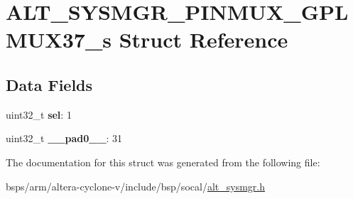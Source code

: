 \hypertarget{structALT__SYSMGR__PINMUX__GPLMUX37__s}{}\section{A\+L\+T\+\_\+\+S\+Y\+S\+M\+G\+R\+\_\+\+P\+I\+N\+M\+U\+X\+\_\+\+G\+P\+L\+M\+U\+X37\+\_\+s Struct Reference}
\label{structALT__SYSMGR__PINMUX__GPLMUX37__s}
\subsection*{Data Fields}
\begin{DoxyCompactItemize}
\item 
\mbox{\label{structALT__SYSMGR__PINMUX__GPLMUX37__s_a518b3017b3f1aae7662e28548d821dc0}} 
uint32\+\_\+t {\bfseries sel}\+: 1
\item 
\mbox{\label{structALT__SYSMGR__PINMUX__GPLMUX37__s_a268a9fe9f5e2ea7c0608901a19fc224a}} 
uint32\+\_\+t {\bfseries \+\_\+\+\_\+pad0\+\_\+\+\_\+}\+: 31
\end{DoxyCompactItemize}


The documentation for this struct was generated from the following file\+:\begin{DoxyCompactItemize}
\item 
bsps/arm/altera-\/cyclone-\/v/include/bsp/socal/\mbox{\hyperlink{alt__sysmgr_8h}{alt\+\_\+sysmgr.\+h}}\end{DoxyCompactItemize}
